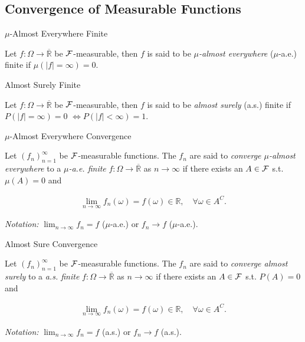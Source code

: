 \subsection{Convergence of Measurable Functions}

\begin{definition}{}{$\mu$-Almost Everywhere Finite}

    Let $f: \Omega \to \overline{\mathbb{R}}$ be $\mathcal{F}$-measurable, then $f$ is said to be \emph{$\mu$-almost everywhere} ($\mu$-a.e.) finite if $\mu(|f| = \infty) = 0$.

\end{definition}

\begin{definition}{}{Almost Surely Finite}

    Let $f: \Omega \to \overline{\mathbb{R}}$ be $\mathcal{F}$-measurable, then $f$ is said to be \emph{almost surely} (a.s.) finite if $P(|f| = \infty) = 0$ $\Leftrightarrow P(|f| < \infty) = 1$.

\end{definition}

\begin{definition}{5.1}{$\mu$-Almost Everywhere Convergence}

    Let $(f_n)_{n=1}^{\infty}$ be $\mathcal{F}$-measurable functions. The $f_n$ are said to \emph{converge $\mu$-almost everywhere} to a \emph{$\mu$-a.e. finite} $f: \Omega \to \overline{\mathbb{R}}$ as $n \to \infty$ if there exists an $A \in \mathcal{F}$ s.t. $\mu(A) = 0$ and

        \begin{align*}
            \lim_{n \to \infty} f_n(\omega) = f(\omega) \in \mathbb{R}, \quad \forall \omega \in A^C.
        \end{align*}

    \emph{Notation:} $\lim_{n \to \infty} f_n = f$ ($\mu$-a.e.) or $f_n \to f$ ($\mu$-a.e.).

\end{definition}

\begin{definition}{5.1}{Almost Sure Convergence}

    Let $(f_n)_{n=1}^{\infty}$ be $\mathcal{F}$-measurable functions. The $f_n$ are said to \emph{converge almost surely} to a \emph{a.s. finite} $f: \Omega \to \overline{\mathbb{R}}$ as $n \to \infty$ if there exists an $A \in \mathcal{F}$ s.t. $P(A) = 0$ and

        \begin{align*}
            \lim_{n \to \infty} f_n(\omega) = f(\omega) \in \mathbb{R}, \quad \forall \omega \in A^C.
        \end{align*}

    \emph{Notation:} $\lim_{n \to \infty} f_n = f$ (a.s.) or $f_n \to f$ (a.s.).

\end{definition}

